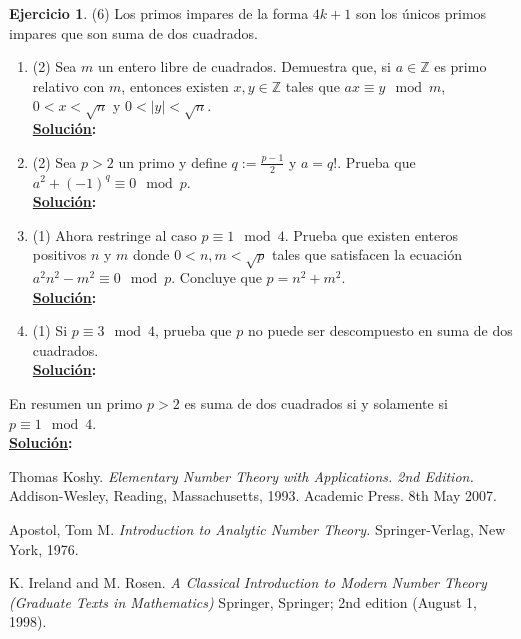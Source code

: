 \documentclass[11pt,letterpaper]{article}
\theoremstyle{definition}\newtheorem{p}{Ejercicio}
\newcommand{\Z}{\mathbb{Z}}
\newcommand{\sol}{\textbf{\underline{Solución}: }} %
\begin{document}
\begin{p}(6)
Los primos impares de la forma $4k+1$ son los \'unicos primos impares que son suma de dos cuadrados.
\begin{enumerate}
  \item(2) Sea $m$ un entero libre de cuadrados. Demuestra que, si $a\in\Z$ es primo relativo con $m$,
  entonces existen $x,y\in\Z$ tales que $ax\equiv y\mod m$, $0<x<\sqrt{n}$ y $0<|y|<\sqrt{n}$.\\
  \sol
  \item(2) Sea $p>2$ un primo y define $q:=\frac{p-1}{2}$ y $a=q!$. Prueba que $a^2+(-1)^q\equiv 0\mod p$.\\
  \sol

  \item(1) Ahora restringe al caso $p\equiv 1\mod 4$. Prueba que existen enteros positivos $n$ y $m$
  donde $0<n,m<\sqrt{p}$ tales que satisfacen la ecuaci\'on $a^2n^2-m^2\equiv 0\mod p$. Concluye
  que $p=n^2+m^2$.\\
  \sol

  \item(1) Si $p\equiv 3\mod 4$, prueba que $p$ no puede ser descompuesto en suma de dos cuadrados.\\
  \sol

\end{enumerate}
En resumen un primo $p>2$ es suma de dos cuadrados si y solamente si $p\equiv 1\mod 4$.\\
\sol
\end{p}




\begin{thebibliography}{}

\bibitem{} 
Thomas Koshy. 
\textit{Elementary Number Theory with Applications. 2nd Edition.}
Addison-Wesley, Reading, Massachusetts, 1993.
Academic Press. 
8th May 2007.

\bibitem{}
Apostol, Tom M. 
\textit{Introduction to Analytic Number Theory.} 
Springer-Verlag, New York, 1976.

\bibitem{}
K. Ireland and M. Rosen.
\textit{A Classical Introduction to Modern Number Theory (Graduate Texts in Mathematics)}
Springer, Springer; 2nd edition (August 1, 1998).

\end{thebibliography}
\end{document}
